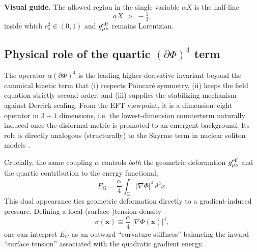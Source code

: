 \documentclass{article}
\begin{document}
\medskip
\noindent\textbf{Visual guide.}
The allowed region in the single variable $\alpha X$ is the half-line
\[
\alpha X \;>\; -\tfrac{1}{3},
\]
inside which $c_s^2\in(0,1)$ and $g^{\rm eff}_{\mu\nu}$ remains Lorentzian.


\subsection{Physical role of the quartic $(\partial\Phi)^4$ term}
\label{subsec:quartic_role}

The operator $\alpha(\partial\Phi)^4$ is the leading higher-derivative invariant beyond the canonical kinetic term that
(i) respects Poincaré symmetry,
(ii) keeps the field equation strictly second order,
and (iii) supplies the stabilizing mechanism against Derrick scaling.
From the EFT viewpoint, it is a dimension–eight operator in $3+1$ dimensions, i.e. the lowest-dimension counterterm naturally induced once the disformal metric is promoted to an emergent background. Its role is directly analogous (structurally) to the Skyrme term in nuclear soliton models \cite{Skyrme1961,Adkins1983}.

Crucially, the same coupling $\alpha$ controls \emph{both} the geometric deformation $g^{\rm eff}_{\mu\nu}$ and the quartic contribution to the energy functional,
\begin{equation}
E_G = \frac{\alpha}{4}\int_{\Sigma} |\nabla\Phi|^4\, d^3x .
\label{eq:EG_def}
\end{equation}
This dual appearance ties geometric deformation directly to a gradient-induced pressure. Defining a local (surface-)tension density
\begin{equation}
\sigma(\mathbf{x}) \equiv \frac{\alpha}{4}\,|\nabla\Phi(\mathbf{x})|^4 ,
\label{eq:local_tension}
\end{equation}
one can interpret $E_G$ as an outward “curvature stiffness” balancing the inward “surface tension” associated with the quadratic gradient energy.
\end{document}
